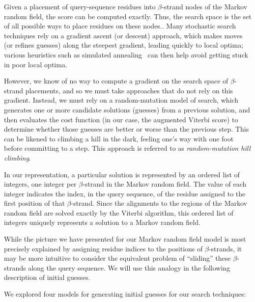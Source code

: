 \documentclass{acm_proc_article-sp}
\begin{document}
Given a placement of query-sequence residues into $\beta$-strand nodes of the
Markov random field, the score can be computed exactly.
Thus, the search space is the set of all possible ways to place residues on
these nodes..
Many stochastic search techniques rely on a gradient ascent (or descent)
approach, which makes moves (or refines guesses) along the steepest gradient,
leading quickly to local optima; various heuristics such as simulated 
annealing~\cite{Kirkpatrick:1983wa} can then help avoid getting stuck in poor
local optima.


However, we know of no way to compute a gradient on the search space of
$\beta$-strand placements, and so we must take approaches that do not rely
on this gradient.
Instead, we must rely on a random-mutation model of search, which generates one
or more candidate solutions (guesses) from a previous solution, and then
evaluates the cost function (in our case, the augmented Viterbi score) to
determine whether those guesses are better or worse than the previous step.
This can be likened to climbing a hill in the dark, feeling one's way with one 
foot before committing to a step.
This approach is referred to as \emph{random-mutation hill
 climbing}\cite{Davis:1991vx}.


In our representation, a particular solution is represented by an ordered list
of integers, one integer per $\beta$-strand in the Markov random field.
The value of each integer indicates the index, in the query sequence, of the
residue assigned to the first position of that $\beta$-strand.
Since the alignments to the regions of the Markov random field are solved
exactly by the Viterbi algorithm, this ordered list of integers uniquely
represents a solution to a Markov random field.

While the picture we have presented for our Markov random field model is most
precisely explained by assigning residue indices to the positions of 
$\beta$-strands, it may be more intuitive to consider the equivalent problem
of ``sliding'' these $\beta$-strands along the query sequence.
We will use this analogy in the following description of initial guesses.

We explored four models for generating initial guesses for our search
techniques:
\end{document}
